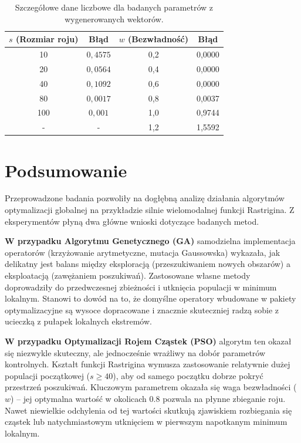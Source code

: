\documentclass[12pt, a4paper]{article}
\begin{document}
\begin{table}[H]
\caption{Szczegółowe dane liczbowe dla badanych parametrów z wygenerowanych wektorów.}
\centering
\begin{tabular}{cc|cc}
\toprule
\textbf{$s$ (Rozmiar roju)} & \textbf{Błąd} & \textbf{ $w$ (Bezwładność)} & \textbf{Błąd} \\
\midrule
10 & $0,4575$ & 0,2 & 0,0000 \\
20 & $0,0564$ & 0,4 & 0,0000 \\
40 & $0,1092$ & 0,6 & 0,0000 \\
80 & $0,0017$ & 0,8 & 0,0037 \\
100 & $0,001$ & 1,0 & 0,9744 \\
-   & -       & 1,2 & 1,5592 \\
\bottomrule
\end{tabular}
\end{table}

\section{Podsumowanie}
Przeprowadzone badania pozwoliły na dogłębną analizę działania algorytmów optymalizacji globalnej na przykładzie silnie wielomodalnej funkcji Rastrigina. Z eksperymentów płyną dwa główne wnioski dotyczące badanych metod.

\textbf{W przypadku Algorytmu Genetycznego (GA)} samodzielna implementacja operatorów (krzyżowanie arytmetyczne, mutacja Gaussowska) wykazała, jak delikatny jest balans między eksploracją (przeszukiwaniem nowych obszarów) a eksploatacją (zawężaniem poszukiwań). Zastosowane własne metody doprowadziły do przedwczesnej zbieżności i utknięcia populacji w minimum lokalnym. Stanowi to dowód na to, że domyślne operatory wbudowane w pakiety optymalizacyjne są wysoce dopracowane i znacznie skuteczniej radzą sobie z ucieczką z pułapek lokalnych ekstremów.

\textbf{W przypadku Optymalizacji Rojem Cząstek (PSO)} algorytm ten okazał się niezwykle skuteczny, ale jednocześnie wrażliwy na dobór parametrów kontrolnych. Kształt funkcji Rastrigina wymusza zastosowanie relatywnie dużej populacji początkowej ($s \ge 40$), aby od samego początku dobrze pokryć przestrzeń poszukiwań. Kluczowym parametrem okazała się waga bezwładności ($w$) -- jej optymalna wartość w okolicach $0.8$ pozwala na płynne zbieganie roju. Nawet niewielkie odchylenia od tej wartości skutkują zjawiskiem rozbiegania się cząstek lub natychmiastowym utknięciem w pierwszym napotkanym minimum lokalnym.
\end{document}
